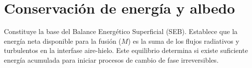 \documentclass[12pt,a4paper,chapterprefix=false,headings=twolinechapter]{scrreprt}
\newcommand{\contraportadaA}{
    \newpage
    \thispagestyle{empty}
    \begin{tcolorbox}[boxrule=0pt,frame hidden,colback=red!65, enhanced, height=\textheight,text width=\textwidth / 64]
    \end{tcolorbox}
}
\begin{document}
\vspace{0.5cm}

\section{Conservación de energía y albedo}
Constituye la base del Balance Energético Superficial (SEB). Establece que la energía neta disponible para la fusión ($M$) es la suma de los flujos radiativos y turbulentos en la interfase aire-hielo. 
Este equilibrio determina si existe suficiente energía acumulada para iniciar procesos de cambio de fase irreversibles. 
\contraportadaA
\end{document}
